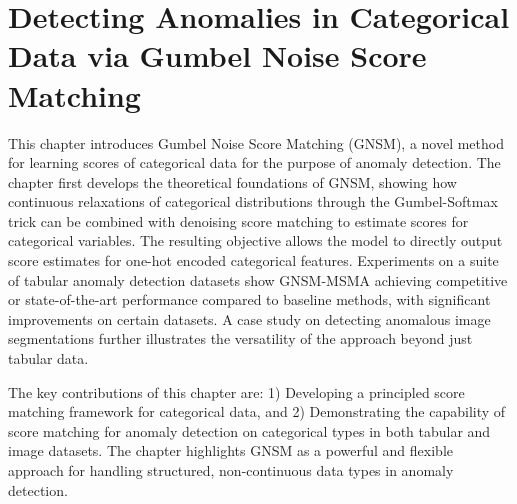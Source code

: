 \chapter{Detecting Anomalies in Categorical Data via Gumbel Noise Score Matching}
\label{ch:gnsm}




This chapter introduces Gumbel Noise Score Matching (GNSM), a novel method for learning scores of categorical data for the purpose of anomaly detection.
The chapter first develops the theoretical foundations of GNSM, showing how continuous relaxations of categorical distributions through the Gumbel-Softmax trick can be combined with denoising score matching to estimate scores for categorical variables. The resulting objective allows the model to directly output score estimates for one-hot encoded categorical features.
Experiments on a suite of tabular anomaly detection datasets show GNSM-MSMA achieving competitive or state-of-the-art performance compared to baseline methods, with significant improvements on certain datasets. A case study on detecting anomalous image segmentations further illustrates the versatility of the approach beyond just tabular data.

The key contributions of this chapter are: 1) Developing a principled score matching framework for categorical data, and 2) Demonstrating the capability of score matching for anomaly detection on categorical types in both tabular and image datasets. The chapter highlights GNSM as a powerful and flexible approach for handling structured, non-continuous data types in anomaly detection.





